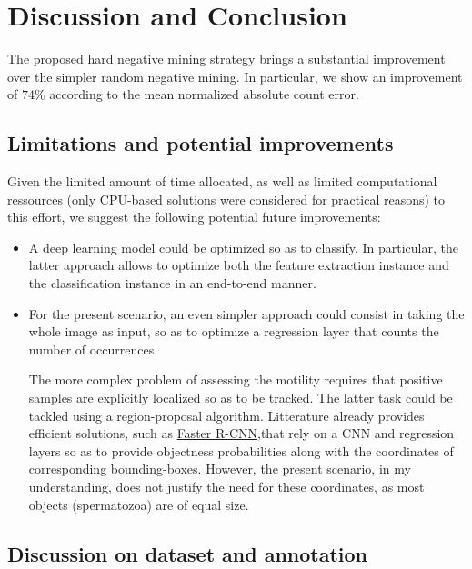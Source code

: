 \documentclass[11pt]{article}
\begin{document}
\section{Discussion and Conclusion}
\label{sec:orgaa7fc36}

The proposed hard negative mining strategy brings a substantial improvement over the simpler random negative mining.
In particular, we show an improvement of \(74\%\) according to the mean normalized absolute count error.

\subsection{Limitations and potential improvements}
\label{sec:org618ed82}

Given the limited amount of time allocated, as well as limited computational ressources (only CPU-based solutions were considered for practical reasons) to this effort, we suggest the following potential future improvements:

\begin{itemize}
\item A deep learning model could be optimized so as to classify. In particular, the latter approach allows
to optimize both the feature extraction instance and the classification instance in an end-to-end manner.
\item For the present scenario, an even simpler approach could consist in taking the whole image as input,
so as to optimize a regression layer that counts the number of occurrences.

The more complex problem of assessing the motility requires that positive samples are explicitly localized so as to be tracked.
The latter task could be tackled using a region-proposal algorithm.
Litterature already provides efficient solutions, such as \href{https://arxiv.org/abs/1506.01497}{Faster R-CNN},that rely on a CNN and regression layers so as to provide
objectness probabilities along with the coordinates of corresponding bounding-boxes.
However, the present scenario, in my understanding, does not justify the need for these coordinates, as most objects (spermatozoa)
are of equal size.
\end{itemize}

\subsection{Discussion on dataset and annotation}
\label{sec:org65f4a15}
\end{document}
